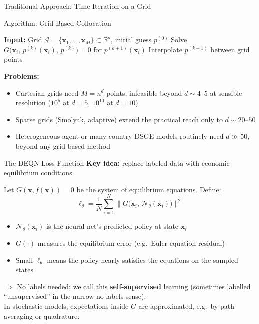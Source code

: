 \documentclass[aspectratio=169,11pt]{beamer}
\newcommand{\emphc}[1]{\textcolor{harvardcrimson}{#1}}
\newcommand{\x}{\bm{x}}
\newcommand{\R}{\mathbb{R}}
\begin{document}
\begin{frame}{Traditional Approach: Time Iteration on a Grid}
\begin{alertblock}{Algorithm: Grid-Based Collocation}
\begin{algorithmic}
\small
\STATE \textbf{Input:} Grid $\mathcal{G} = \{\x_1, \ldots, \x_M\} \subset \R^d$, initial guess $p^{(0)}$
    \FOR{each grid point $\x_i \in \mathcal{G}$}
        \STATE Solve $G\bigl(\x_i,\, p^{(k)}(\x_i),\, p^{(k)}\bigr) = 0$ for $p^{(k+1)}(\x_i)$
    \ENDFOR
    \STATE Interpolate $p^{(k+1)}$ between grid points
\ENDFOR
\end{algorithmic}
\end{alertblock}

\vspace{0.3em}
\textbf{Problems:}
\begin{itemize}
    \item \emphc{Cartesian} grids need $M=n^d$ points, infeasible beyond $d\sim4\text{--}5$ at sensible resolution ($10^5$ at $d\!=\!5$, $10^{10}$ at $d\!=\!10$)
    \item \emphc{Sparse grids} (Smolyak, adaptive) extend the practical reach only to $d \sim 20\text{--}50$
    \item Heterogeneous-agent or many-country DSGE models routinely need $d \gg 50$, beyond any grid-based method
\end{itemize}
\end{frame}

\begin{frame}{The DEQN Loss Function}
\textbf{Key idea:} replace labeled data with \emphc{economic equilibrium conditions}.

\vspace{0.5em}
Let $G(\x, f(\x)) = 0$ be the system of equilibrium equations. Define:
\[
\boxed{
\ell_\theta = \frac{1}{N} \sum_{i=1}^{N} \bigl\| G\bigl(\x_i,\, \mathcal{N}_\theta(\x_i)\bigr) \bigr\|^2
}
\]

\vspace{0.3em}
\begin{itemize}
    \item $\mathcal{N}_\theta(\x_i)$ is the neural net's \emphc{predicted policy} at state $\x_i$
    \item $G(\cdot)$ measures the \emphc{equilibrium error} (e.g.\ Euler equation residual)
    \item Small $\ell_\theta$ means the policy nearly satisfies the equations on the sampled states
\end{itemize}

\vspace{0.5em}
$\Rightarrow$ \emphc{No labels needed}; we call this \textbf{self-supervised} learning (sometimes labelled ``unsupervised'' in the narrow no-labels sense).
\\[2pt]
{\scriptsize In stochastic models, expectations inside $G$ are approximated, e.g.\ by path averaging or quadrature.}
\end{frame}
\end{document}
